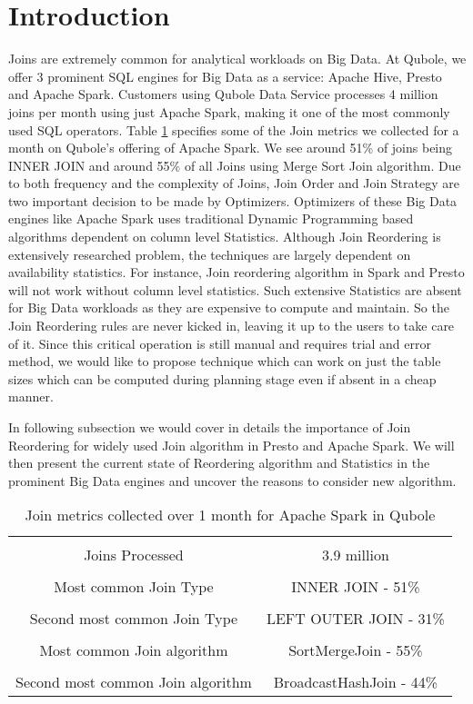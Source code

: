 \documentclass[conference]{IEEEtran}
\begin{document}
\section{Introduction}
Joins are extremely common for analytical workloads on Big Data. At Qubole, we offer 3 prominent SQL engines for Big Data as a service: Apache Hive, Presto and Apache Spark. Customers using Qubole Data Service processes 4 million joins per month using just Apache Spark, making it one of the most commonly used SQL operators. Table \ref{tab:stats} specifies some of the Join metrics we collected for a month on Qubole's offering of Apache Spark. We see around 51\% of joins being INNER JOIN and around 55\% of all Joins using Merge Sort Join algorithm. Due to both frequency and the complexity of Joins, Join Order and Join Strategy are two important decision to be made by Optimizers. Optimizers of these Big Data engines like Apache Spark uses traditional Dynamic Programming based algorithms \cite{b1} dependent on column level Statistics. Although Join Reordering is extensively researched problem, the techniques are largely dependent on availability statistics. For instance, Join reordering algorithm in Spark and Presto will not work without column level statistics.  Such extensive Statistics are absent for Big Data workloads as they are expensive to compute and maintain. So the Join Reordering rules are never kicked in, leaving it up to the users to take care of it. Since this critical operation is still manual and  requires trial and error method, we would like to propose technique which can work on just the table sizes which can be computed during planning stage even if absent in a cheap manner.

In following subsection we would cover in details the importance of Join Reordering for widely used Join algorithm in Presto and Apache Spark. We will then present the current state of Reordering algorithm and Statistics in the prominent Big Data engines and uncover the reasons to consider new algorithm.

\begin{table}[h]
\begin{center}
\begin{tabular}{ |c|c| }
 \hline \\
Joins Processed & 3.9 million \\ \hline \\
Most common Join Type & INNER JOIN - 51\%  \\  \hline \\
Second most common Join Type &  LEFT OUTER JOIN - 31\%\\ \hline  \\
Most common Join algorithm & SortMergeJoin - 55\%\\ \hline \\
Second most common Join algorithm & BroadcastHashJoin - 44\%\\
 \hline
\end{tabular}
\caption{Join metrics collected over 1 month for Apache Spark in Qubole}
\label{tab:stats}
\end{center}
\end{table}
\end{document}
